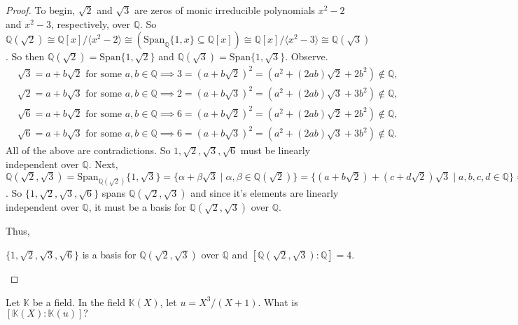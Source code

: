 \documentclass[addpoints,10pt]{exam}
\theoremstyle{plain}
\theoremstyle{definition}
\newtheorem{prob}[thm]{Problem}
\theoremstyle{plain}
\theoremstyle{plain}
\theoremstyle{definition}
\let\oldprob\prob
\let\endoldprob\endprob
\renewenvironment{prob}
  {\begin{singlespace}\oldprob}
  {\endoldprob\end{singlespace}}
\newcommand{\KK}{\ensuremath{\mathbb{K}}}
\newcommand{\QQ}{\ensuremath{\mathbb{Q}}}
\begin{document}
\begin{proof}
To begin, $\sqrt{2}$ and $\sqrt{3}$ are zeros of monic irreducible polynomials $x^{2}-2$ and $x^{2}-3$, respectively, over $\QQ$. So $\QQ(\sqrt{2})\cong \QQ[x]/\langle x^{2}-2\rangle\cong (\mathrm{Span}_{\QQ}\{1,x\}\subseteq \QQ[x]) \cong \QQ[x]/\langle x^{2}-3\rangle \cong \QQ(\sqrt{3})$. So then $\QQ(\sqrt{2})=\mathrm{Span}\{1,\sqrt{2}\}$ and $\QQ(\sqrt{3})=\mathrm{Span}\{1,\sqrt{3}\}$. Observe. 
\begin{align*}
  &\sqrt{3}=a+b\sqrt{2}\text{ for some }a,b\in \QQ \implies 3=(a+b\sqrt{2})^{2}=(a^{2}+(2ab)\sqrt{2}+2b^{2})\not\in \QQ,\\
  &\sqrt{2}=a+b\sqrt{3}\text{ for some }a,b\in \QQ\implies 2=(a+b\sqrt{3})^{2}=(a^{2}+(2ab)\sqrt{3}+3b^{2})\not\in \QQ,\\
  &\sqrt{6}=a+b\sqrt{2}\text{ for some }a,b\in \QQ\implies 6=(a+b\sqrt{2})^{2}=(a^{2}+(2ab)\sqrt{2}+2b^{2})\not\in \QQ,\\
  &\sqrt{6}=a+b\sqrt{3}\text{ for some }a,b\in \QQ\implies 6=(a+b\sqrt{3})^{2}=(a^{2}+(2ab)\sqrt{3}+3b^{2})\not\in \QQ.
\end{align*}
  All of the above are contradictions. So $1,\sqrt{2},\sqrt{3},\sqrt{6}$ must be linearly independent over $\QQ$. Next, $\QQ(\sqrt{2},\sqrt{3})=\mathrm{Span}_{\QQ(\sqrt{2})}\{1,\sqrt{3}\}=\{\alpha+\beta\sqrt{3}\mid \alpha,\beta\in \QQ(\sqrt{2})\}=\{(a+b\sqrt{2})+(c+d\sqrt{2})\sqrt{3}\mid a,b,c,d\in \QQ\}=\{a+b\sqrt{2}+c\sqrt{3}+d\sqrt{6}\mid a,b,c,d\in \QQ\}$. So $\{1,\sqrt{2},\sqrt{3},\sqrt{6}\}$ spans $\QQ(\sqrt{2},\sqrt{3})$ and since it's elements are linearly independent over $\QQ$, it must be a basis for $\QQ(\sqrt{2},\sqrt{3})$ over $\QQ$.

  Thus,
  \begin{center}
    $\{1,\sqrt{2},\sqrt{3},\sqrt{6}\}$ is a basis for $\QQ(\sqrt{2},\sqrt{3})$ over $\QQ$ and $[\QQ(\sqrt{2},\sqrt{3}):\QQ]=4.$
  \end{center}
\end{proof}

\newpage
\begin{prob}
Let $\KK$ be a field. In the field $\KK(X)$, let $u=X^{3}/(X+1)$. What is $[\KK(X):\KK(u)]?$
\end{prob}
\end{document}
